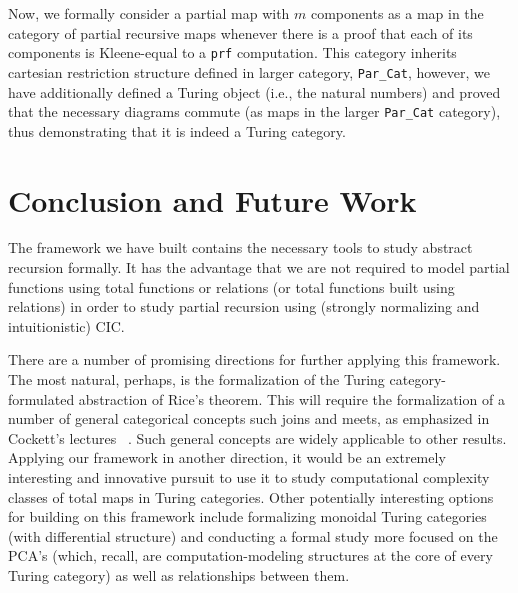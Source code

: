 \documentclass{entcs} \usepackage{entcsmacro}
\begin{document}
Now, we formally consider a partial map with $m$ components as a map in the category of partial recursive maps whenever there is a proof that each of its components is Kleene-equal to a {\tt prf} computation. This category inherits cartesian restriction structure defined in larger category, {\tt Par\_Cat}, however, we have additionally defined a Turing object (i.e., the natural numbers) and proved that the necessary diagrams commute (as maps in the larger {\tt Par\_Cat} category), thus demonstrating that it is indeed a Turing category.

\section{Conclusion and Future Work}

The framework we have built contains the necessary tools to study
abstract recursion formally. It has the advantage that we are not
required to model partial functions using total functions or relations
(or total functions built using relations) in order to study partial
recursion using (strongly normalizing and intuitionistic) CIC.

There are a number of promising directions
for further applying this framework.  The most natural, perhaps, is
the formalization of the Turing category-formulated abstraction of
Rice's theorem.  This will require the formalization of a number of
general categorical concepts such joins and meets, as emphasized in
Cockett's lectures ~\cite{Estonia}.  Such general concepts are widely
applicable to other results.  Applying our framework in another
direction, it would be an extremely interesting and innovative pursuit
to use it to study computational complexity classes of total maps in
Turing categories. Other potentially interesting options for building
on this framework include formalizing monoidal Turing categories (with
differential structure) and conducting a formal study more focused on
the PCA's (which, recall, are computation-modeling structures at the
core of every Turing category) as well as relationships between them.








\end{document}
